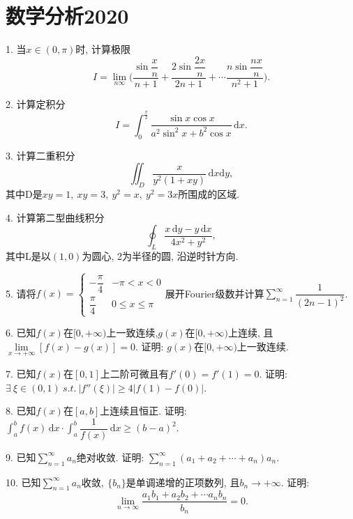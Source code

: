 \documentclass[12pt, a4paper, twoside]{ctexart}%
\newcommand{\rmd}{\mathrm{d}} %
\begin{document}
	\section{数学分析2020}
	1. 当$x\in(0,\pi)$时, 计算极限\[I=\lim\limits_{n\infty}\bigg(\dfrac{\sin \dfrac{x}{n}}{n+1}+\dfrac{2\sin \dfrac{2x}{n}}{2n+1}+\cdots\dfrac{n\sin \dfrac{nx}{n}}{n^2+1}
	\bigg).\]\par 
	2. 计算定积分\[I=\int_{0}^{\frac{\pi}{2}}\dfrac{\sin x\cos x}{a^2\sin^2x+b^2\cos x}\,\rmd x.\]\par 
	3. 计算二重积分\[
	\iint_D\dfrac{x}{y^2(1+xy)}\,\rmd x\rmd y,\]
	其中D是$xy=1,\ xy=3,\ y^2=x,\ y^2=3x$所围成的区域.\par
	4. 计算第二型曲线积分\[
	\oint_{L}\dfrac{x\,\rmd y-y\,\rmd x}{4x^2+y^2},\]
	其中L是以$(1,0)$为圆心, 2为半径的圆, 沿逆时针方向.\par
	5. 请将$f(x)=\begin{cases}
		-\dfrac{\pi}{4}&-\pi<x<0\\
		\dfrac{\pi}{4}&0\leq x\leq\pi
	\end{cases}$展开Fourier级数并计算$\sum\limits_{n=1}^\infty\dfrac{1}{(2n-1)^2}$.\par 
	6. 已知$f(x)\mbox{在}[0,+\infty)$上一致连续,$g(x)\mbox{在}[0,+\infty)$上连续, 且$\lim\limits_{x\rightarrow+\infty}[f(x)-g(x)]=0$. 证明: $g(x)\mbox{在}[0,+\infty)$上一致连续.\par 
	7. 已知$f(x)$在$[0,1]$上二阶可微且有$f'(0)=f'(1)=0$. 证明: $\exists\ \xi\in(0,1)\ s.t.\ |f''(\xi)|\ge4|f(1)-f(0)|$.\par 
	8. 已知$f(x)$在$[a,b]$上连续且恒正. 证明: $\int_a^bf(x)\,\rmd x\cdot\int_a^b\dfrac{1}{f(x)}\,\rmd x\ge(b-a)^2$.\par 
	9. 已知$\sum\limits_{n=1}^\infty a_n$绝对收敛. 证明: $\sum\limits_{n=1}^\infty(a_1+a_2+\cdots+a_n)a_n$.\par 
	10. 已知$\sum\limits_{n=1}^\infty a_n\mbox{收敛},\ \{b_n\}$是单调递增的正项数列, 且$b_n\rightarrow+\infty$. 证明:\[
	\lim\limits_{n\rightarrow\infty}\dfrac{a_1b_1+a_2b_2+\cdots a_nb_n}{b_n}=0.\]\par 
	\clearpage
\end{document}
